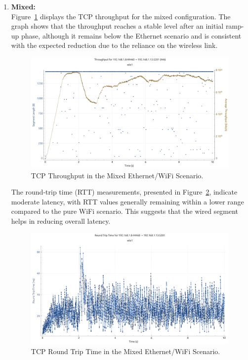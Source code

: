 \begin{enumerate}
            \item \textbf{Mixed:} \\
                Figure~\ref{fig:throughput-mix-tcp} displays the TCP throughput for the mixed configuration. 
                The graph shows that the throughput reaches a stable level after an initial ramp-up phase, although it remains below the Ethernet scenario and is consistent with the expected reduction due to the reliance on the wireless link. \\

                \begin{figure}[ht]
                    \centering
                    \includegraphics[width=0.9\columnwidth]{images/graphs/Throughput/Throughput_MIX_TCP.pdf}
                    \caption{TCP Throughput in the Mixed Ethernet/WiFi Scenario.}
                    \label{fig:throughput-mix-tcp}
                \end{figure}

                The round-trip time (RTT) measurements, presented in Figure~\ref{fig:rtt-mix-tcp}, indicate moderate latency, with RTT values generally remaining within a lower range compared to the pure WiFi scenario. 
                This suggests that the wired segment helps in reducing overall latency. \\

                \begin{figure}[ht]
                    \centering
                    \includegraphics[width=0.9\columnwidth]{images/graphs/RTT/RTT_MIX_TCP.pdf}
                    \caption{TCP Round Trip Time in the Mixed Ethernet/WiFi Scenario.}
                    \label{fig:rtt-mix-tcp}
                \end{figure}


\end{enumerate}
